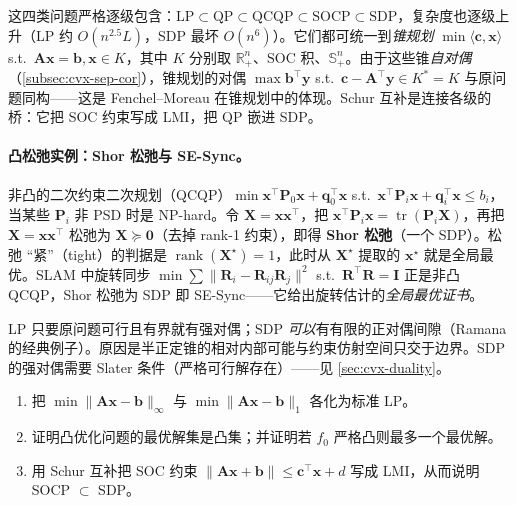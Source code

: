 \begin{insight}\label{ins:cone-chain}
这四类问题严格逐级包含：$\mathrm{LP}\subset\mathrm{QP}\subset\mathrm{QCQP}\subset\mathrm{SOCP}\subset\mathrm{SDP}$，复杂度也逐级上升（LP 约 $O(n^{2.5}L)$，SDP 最坏 $O(n^6)$）。它们都可统一到\emph{锥规划} $\min\langle\mathbf c,\mathbf x\rangle$ s.t.\ $\mathbf A\mathbf x=\mathbf b,\mathbf x\in K$，其中 $K$ 分别取 $\mathbb{R}^n_+$、$\mathrm{SOC}$ 积、$\mathbb{S}^n_+$。由于这些锥\emph{自对偶}（\cref{subsec:cvx-sep-cor}），锥规划的对偶 $\max\mathbf b^\top\mathbf y$ s.t.\ $\mathbf c-\mathbf A^\top\mathbf y\in K^\ast=K$ 与原问题同构——这是 Fenchel--Moreau 在锥规划中的体现。Schur 互补是连接各级的桥：它把 SOC 约束写成 LMI，把 QP 嵌进 SDP。
\end{insight}

\paragraph{凸松弛实例：Shor 松弛与 SE-Sync。}
非凸的二次约束二次规划（QCQP）$\min\mathbf x^\top\mathbf P_0\mathbf x+\mathbf q_0^\top\mathbf x$ s.t.\ $\mathbf x^\top\mathbf P_i\mathbf x+\mathbf q_i^\top\mathbf x\le b_i$，当某些 $\mathbf P_i$ 非 PSD 时是 NP-hard。令 $\mathbf X=\mathbf x\mathbf x^\top$，把 $\mathbf x^\top\mathbf P_i\mathbf x=\operatorname{tr}(\mathbf P_i\mathbf X)$，再把 $\mathbf X=\mathbf x\mathbf x^\top$ 松弛为 $\mathbf X\succeq\mathbf 0$（去掉 rank-1 约束），即得 \textbf{Shor 松弛}（一个 SDP）。松弛 “紧”（tight）的判据是 $\operatorname{rank}(\mathbf X^\star)=1$，此时从 $\mathbf X^\star$ 提取的 $\mathbf x^\star$ 就是全局最优。SLAM 中旋转同步 $\min\sum\|\mathbf R_i-\mathbf R_{ij}\mathbf R_j\|^2$ s.t.\ $\mathbf R^\top\mathbf R=\mathbf I$ 正是非凸 QCQP，Shor 松弛为 SDP 即 SE-Sync——它给出旋转估计的\emph{全局最优证书}。

\begin{pitfall}
LP 只要原问题可行且有界就有强对偶；SDP \emph{可以}有有限的正对偶间隙（Ramana 的经典例子）。原因是半正定锥的相对内部可能与约束仿射空间只交于边界。SDP 的强对偶需要 Slater 条件（严格可行解存在）——见 \cref{sec:cvx-duality}。
\end{pitfall}

\begin{practice}
\begin{enumerate}
  \item 把 $\min\|\mathbf A\mathbf x-\mathbf b\|_\infty$ 与 $\min\|\mathbf A\mathbf x-\mathbf b\|_1$ 各化为标准 LP。
  \item 证明凸优化问题的最优解集是凸集；并证明若 $f_0$ 严格凸则最多一个最优解。
  \item 用 Schur 互补把 SOC 约束 $\|\mathbf A\mathbf x+\mathbf b\|\le\mathbf c^\top\mathbf x+d$ 写成 LMI，从而说明 SOCP $\subset$ SDP。
\end{enumerate}
\end{practice}

